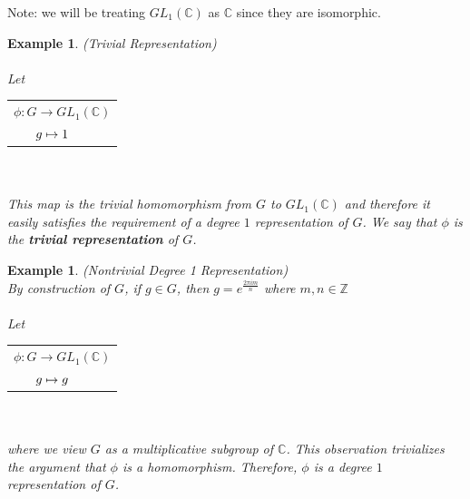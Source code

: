 \documentclass[10pt]{ucthesis}
\newtheorem{example}[definition]{Example}
\begin{document}
\noindent Note: we will be treating $GL_1(\mathbb{C})$ as $\mathbb{C}$ since they are isomorphic.

\begin{example}
	(Trivial Representation)\\\\
	\renewcommand{\arraystretch}{0.7}
	Let   \begin{tabular}{l}$\phi:G\rightarrow GL_1(\mathbb{C})$\\
		$\hspace{6mm}g\mapsto 1$
		\end{tabular} \\\\
	This map is the trivial homomorphism from $G$ to $GL_1(\mathbb{C})$ and therefore it easily satisfies the requirement of a degree $1$ representation of $G$. We say that $\phi$ is the \textbf{trivial representation} of $G$.
\end{example}
	

\begin{example}
	(Nontrivial Degree 1 Representation) \\
	By construction of $G$, if $g\in G$, then $g = e^{\frac{2\pi im }{n}}$ where $m,n\in \mathbb{Z}$	
	\renewcommand{\arraystretch}{0.7}\\\\
	Let   \begin{tabular}{l}$\phi:G\rightarrow GL_1(\mathbb{C})$\\
		$\hspace{6mm}g\mapsto g$
		\end{tabular} \\\\
	where we view $G$ as a multiplicative subgroup of $\mathbb{C}$. This observation trivializes the argument that $\phi$ is a homomorphism. Therefore, $\phi$ is a degree $1$ representation of $G$.		
\end{example}
\end{document}
